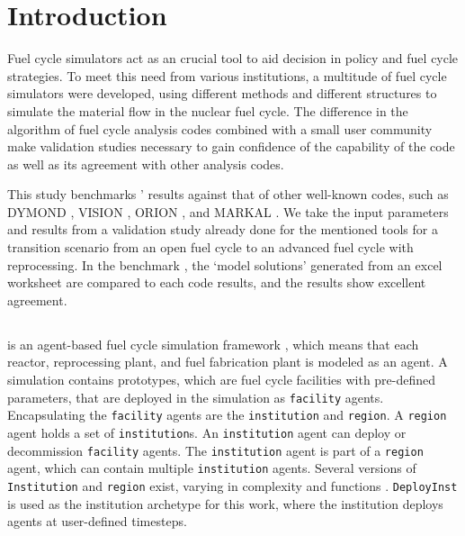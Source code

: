 
\section{Introduction}
Fuel cycle simulators act as an crucial tool to
aid decision in policy and fuel cycle strategies.
To meet this need from various institutions, a
multitude of fuel cycle simulators were developed,
using different methods and different structures
to simulate the material flow in the nuclear fuel cycle.
The difference in the algorithm of fuel cycle analysis
codes combined with a small user community make
validation studies necessary to gain
confidence of the capability of the code as well as its
agreement with other analysis codes.

This study benchmarks \Cyclus' results
against that of other well-known codes, such as
DYMOND \cite{yacout_modeling_2005},
VISION \cite{jacobson_verifiable_2010},
ORION \cite{gregg_analysis_2012}, and
MARKAL \cite{shay_epa_2006}. We take the input
parameters and results from a validation study
\cite{feng_standardized_2016} already done for the
mentioned tools for a transition scenario from an
open fuel cycle to an advanced fuel cycle with
reprocessing. In the benchmark \cite{feng_standardized_2016}, the `model solutions'
generated from an excel worksheet are compared
to each code results, and the results show
excellent agreement.



\subsection{\Cyclus}

\Cyclus is an agent-based fuel cycle simulation framework 
\cite{huff_fundamental_2016}, which means 
that each reactor, reprocessing plant, and fuel fabrication plant is modeled as an agent.
A \Cyclus simulation contains prototypes, which are fuel cycle facilities with
pre-defined parameters, that are deployed in the simulation as \texttt{facility} agents.
Encapsulating the \texttt{facility} agents are the \texttt{institution} and \texttt{region}.
A \texttt{region} agent holds a set of \texttt{institution}s.
An \texttt{institution} agent can deploy or decommission \texttt{facility} agents.
The \texttt{institution} agent is part of a \texttt{region} agent,
which can contain multiple \texttt{institution} agents. Several versions of \texttt{Institution}
and \texttt{region} exist, varying in complexity and functions \cite{huff_extensions_2014}.
 \texttt{DeployInst} is used as the institution archetype for this work, where the institution
deploys agents at user-defined timesteps.

